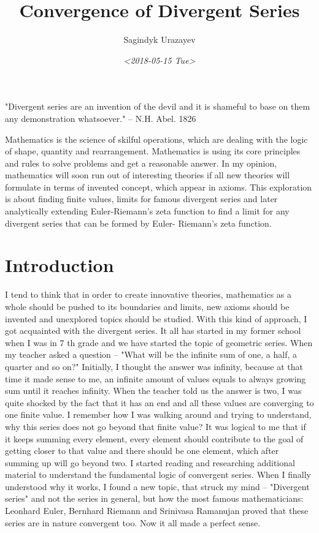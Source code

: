 \documentclass[a4paper]{article}
\author{Sagindyk Urazayev}
\date{\textit{<2018-05-15 Tue>}}
\title{Convergence of Divergent Series}
\begin{document}
\maketitle
\tableofcontents

\listoffigures
\listoftables

\newpage
\begin{center}
"Divergent series are an invention of the devil and it is shameful to base on
them any demonstration whatsoever."\cite{Abel} -- N.H. Abel. 1826
\end{center}

\begin{ABSTRACT}
Mathematics is the science of skilful operations, which are dealing with the
logic of shape, quantity and rearrangement. Mathematics is using its core
principles and rules to solve problems and get a reasonable answer. In my
opinion, mathematics will soon run out of interesting theories if all new
theories will formulate in terms of invented concept, which appear in
axioms. This exploration is about finding finite values, limits for famous
divergent series and later analytically extending Euler-Riemann's zeta function
to find a limit for any divergent series that can be formed by Euler- Riemann's
zeta function.
\end{ABSTRACT}

\section{Introduction}
\label{sec:org81ac42c}
\label{org011b4a0}

I tend to think that in order to create innovative theories, mathematics as a
whole should be pushed to its boundaries and limits, new axioms should be
invented and unexplored topics should be studied. With this kind of approach, I
got acquainted with the divergent series. It all has started in my former school
when I was in 7 th grade and we have started the topic of geometric series. When
my teacher asked a question – "What will be the infinite sum of one, a half, a
quarter and so on?" Initially, I thought the answer was infinity, because at
that time it made sense to me, an infinite amount of values equals to always
growing sum until it reaches infinity. When the teacher told us the answer is
two, I was quite shocked by the fact that it has an end and all these values are
converging to one finite value. I remember how I was walking around and trying
to understand, why this series does not go beyond that finite value? It was
logical to me that if it keeps summing every element, every element should
contribute to the goal of getting closer to that value and there should be one
element, which after summing up will go beyond two. I started reading and
researching additional material to understand the fundamental logic of
convergent series. When I finally understood why it works, I found a new topic,
that struck my mind – "Divergent series" and not the series in general, but how
the most famous mathematicians: Leonhard Euler, Bernhard Riemann and Srinivasa
Ramanujan proved that these series are in nature convergent too. Now it all made
a perfect sense.\\
\end{document}
